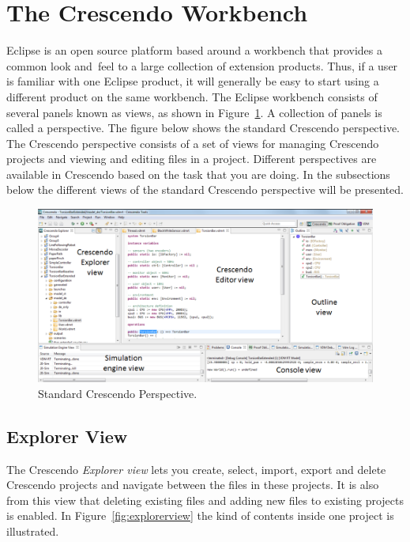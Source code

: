 \documentclass{crescendorepchap}
\begin{document}
\section{The Crescendo Workbench}\label{sec:crescendo}

Eclipse is an open source platform based around a workbench that
provides a common look and~feel to a large collection of extension
products. Thus, if a user is familiar with one Eclipse product, it will
generally be easy to start using a different product on the same
workbench. The Eclipse workbench consists of several panels known as
views, as shown in Figure~\ref{fig:DestecsStartScreen}. 
A collection of panels is called a perspective. The figure below
shows the standard Crescendo perspective. The Crescendo perspective consists
of a set of views for managing Crescendo projects and viewing and editing
files in a project. Different perspectives are available in Crescendo
based on the task that you are doing. In the subsections below the different views of the standard Crescendo perspective will be presented.

\begin{figure}[htbp]
\centering
\includegraphics[width=.9\textwidth]{images/DestecsWorkbenchOutline.png}
\caption{Standard Crescendo Perspective.\label{fig:DestecsStartScreen}}
\end{figure}

\subsection{Explorer View}\label{subsec:explorer}

The Crescendo \emph{Explorer view} lets you create, select, import, export and delete Crescendo
projects and navigate between the files in these projects. It is also from this view that deleting existing files and
adding new files to existing projects is enabled. In Figure~\ref{fig:explorerview} the kind of contents inside one project is illustrated.
\end{document}
